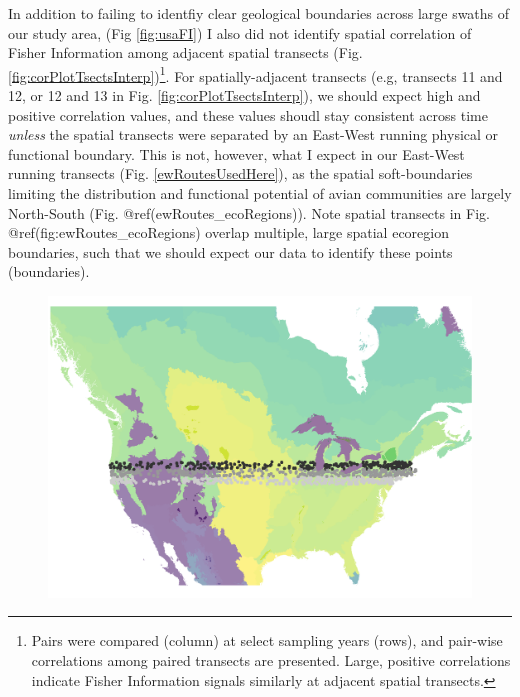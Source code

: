 \documentclass[12pt,twoside,openany]{reedthesis}
\begin{document}
In addition to failing to identfiy clear geological boundaries across
large swaths of our study area, (Fig \ref{fig:usaFI}) I also did not
identify spatial correlation of Fisher Information among adjacent
spatial transects (Fig. \ref{fig:corPlotTsectsInterp})\footnote{Pairs
  were compared (column) at select sampling years (rows), and pair-wise
  correlations among paired transects are presented. Large, positive
  correlations indicate Fisher Information signals similarly at adjacent
  spatial transects.}. For spatially-adjacent transects (e.g, transects
11 and 12, or 12 and 13 in Fig. \ref{fig:corPlotTsectsInterp}), we
should expect high and positive correlation values, and these values
shoudl stay consistent across time \emph{unless} the spatial transects
were separated by an East-West running physical or functional boundary.
This is not, however, what I expect in our East-West running transects
(Fig. \ref{ewRoutesUsedHere}), as the spatial soft-boundaries limiting
the distribution and functional potential of avian communities are
largely North-South (Fig. @ref(ewRoutes\_ecoRegions)). Note spatial
transects in Fig. @ref(fig:ewRoutes\_ecoRegions) overlap multiple, large
spatial ecoregion boundaries, such that we should expect our data to
identify these points (boundaries).
\begin{figure}
\includegraphics[width=0.85\linewidth]{./chapterFiles/fisherSpatial/figures/figsCalledInDiss/allRoutesUsed_ecoregions} \end{figure}
\end{document}
